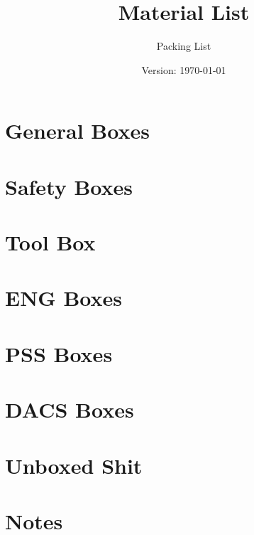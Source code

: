 \documentclass{article}
\title{Material List}
\author{Packing List}
\date{Version: \isodate\today}
\begin{document}
\maketitle

\thispagestyle{fancy}

\renewcommand{\thesection}{\Alph{section}}

\section{General Boxes}


\section{Safety Boxes}

\newpage
\section{Tool Box}


\section{ENG Boxes}


\section{PSS Boxes}

\newpage
\section{DACS Boxes}

\newpage
\section{Unboxed Shit}


\newpage


\setcounter{section}{0}
\section*{Notes}

\end{document}
